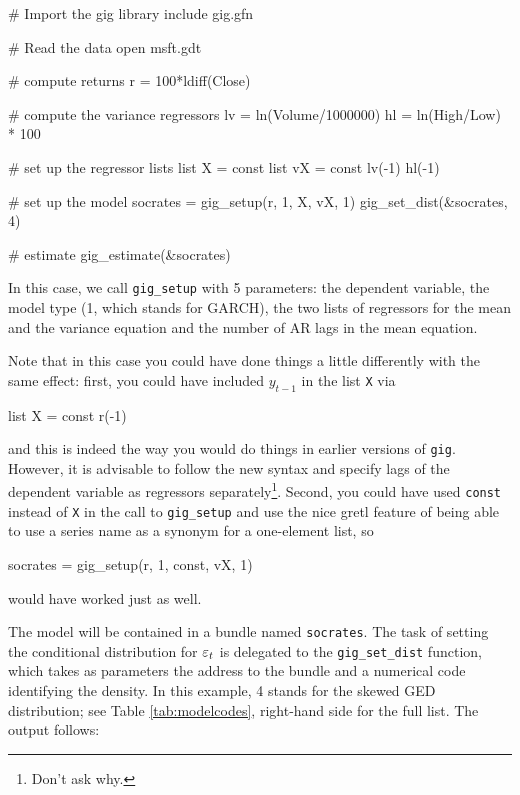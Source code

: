 \documentclass[a4paper,11pt]{article}
\newcommand{\stdu}{\ensuremath \varepsilon}
\newcommand{\gig}{\texttt{gig}}
\begin{document}
\begin{code}
# Import the gig library
include gig.gfn

# Read the data 
open msft.gdt

# compute returns
r = 100*ldiff(Close)

# compute the variance regressors
lv = ln(Volume/1000000)
hl = ln(High/Low) * 100

# set up the regressor lists
list X = const
list vX = const lv(-1) hl(-1)

# set up the model
socrates = gig_setup(r, 1, X, vX, 1)
gig_set_dist(&socrates, 4)

# estimate
gig_estimate(&socrates)
\end{code}

In this case, we call \texttt{gig\_setup} with 5 parameters: the
dependent variable, the model type (1, which stands for GARCH), the
two lists of regressors for the mean and the variance equation and the
number of AR lags in the mean equation.

Note that in this case you could have done things a little differently
with the same effect: first, you could have included $y_{t-1}$ in the
list \texttt{X} via 
\begin{code}
  list X = const r(-1)
\end{code}
and this is indeed the way you would do things in earlier versions of
\gig. However, it is advisable to follow the new syntax and specify
lags of the dependent variable as regressors separately\footnote{Don't
  ask why.}. Second, you could have used \texttt{const} instead of
\texttt{X} in the call to \texttt{gig\_setup} and use the nice gretl
feature of being able to use a series name as a synonym for a
one-element list, so 
\begin{code}
  socrates = gig_setup(r, 1, const, vX, 1)
\end{code}
would have worked just as well.

The model will be contained in a bundle named \texttt{socrates}. The
task of setting the conditional distribution for $\stdu_t$ is
delegated to the \texttt{gig\_set\_dist} function, which takes as
parameters the address to the bundle and a numerical code identifying
the density. In this example, 4 stands for the skewed GED
distribution; see Table \ref{tab:modelcodes}, right-hand side for the
full list. The output follows:
\end{document}
